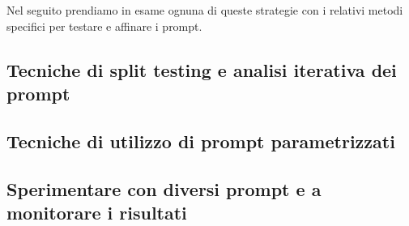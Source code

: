     Nel seguito prendiamo in esame ognuna di queste strategie con i relativi metodi specifici per testare e affinare i prompt. 
    
    \subsection{Tecniche di split testing e analisi iterativa dei prompt}
    \subsection{Tecniche di utilizzo di prompt parametrizzati}
    \subsection{Sperimentare con diversi prompt e a monitorare i risultati}
